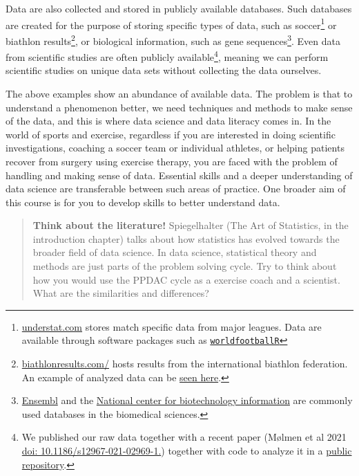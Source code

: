 \documentclass[
  11pt,
  letterpaper,
]{scrbook}
\begin{document}
Data are also collected and stored in publicly available databases. Such
databases are created for the purpose of storing specific types of data,
such as soccer\footnote{\href{https://understat.com/}{understat.com}
  stores match specific data from major leagues. Data are available
  through software packages such as
  \href{https://jaseziv.github.io/worldfootballR/index.html}{\texttt{worldfootballR}}}
or biathlon results\footnote{\href{https://biathlonresults.com/}{biathlonresults.com/}
  hosts results from the international biathlon federation. An example
  of analyzed data can be
  \href{https://sciathlon.github.io/post/biathlon_data_analysis/}{seen
  here}.}, or biological information, such as gene sequences\footnote{\href{https://www.ensembl.org/}{Ensembl}
  and the \href{https://www.ncbi.nlm.nih.gov/}{National center for
  biotechnology information} are commonly used databases in the
  biomedical sciences.}. Even data from scientific studies are often
publicly available\footnote{We published our raw data together with a
  recent paper (Mølmen et al 2021
  \href{https://translational-medicine.biomedcentral.com/articles/10.1186/s12967-021-02969-1}{doi:
  10.1186/s12967-021-02969-1.}) together with code to analyze it in a
  \href{https://github.com/dhammarstrom/rnaseq-copd}{public repository}.},
meaning we can perform scientific studies on unique data sets without
collecting the data ourselves.

The above examples show an abundance of available data. The problem is
that to understand a phenomenon better, we need techniques and methods
to make sense of the data, and this is where data science and data
literacy comes in. In the world of sports and exercise, regardless if
you are interested in doing scientific investigations, coaching a soccer
team or individual athletes, or helping patients recover from surgery
using exercise therapy, you are faced with the problem of handling and
making sense of data. Essential skills and a deeper understanding of
data science are transferable between such areas of practice. One
broader aim of this course is for you to develop skills to better
understand data.

\begin{quote}
\textbf{Think about the literature!} Spiegelhalter (The Art of
Statistics, in the introduction chapter) talks about how statistics has
evolved towards the broader field of data science. In data science,
statistical theory and methods are just parts of the problem solving
cycle. Try to think about how you would use the PPDAC cycle as a
exercise coach and a scientist. What are the similarities and
differences?
\end{quote}
\end{document}
